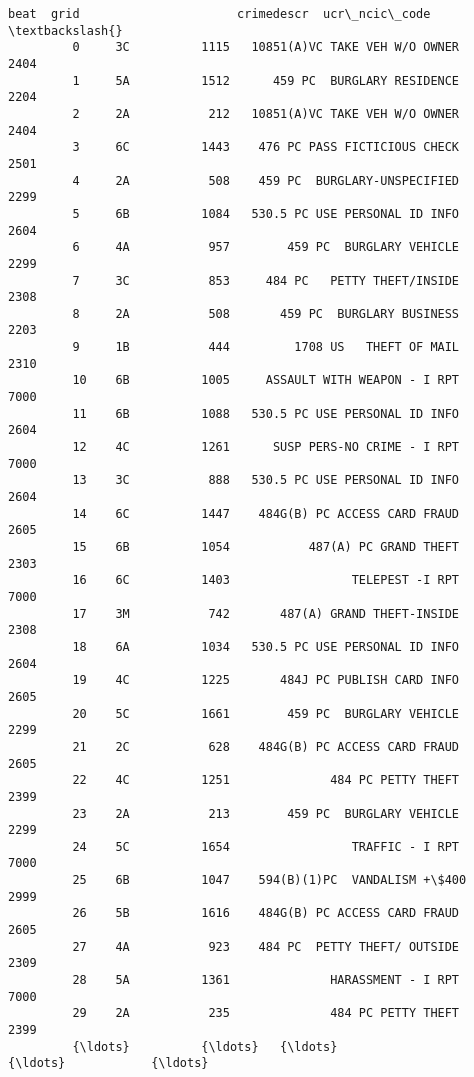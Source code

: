 \documentclass[11pt]{article}
\begin{document}
\begin{Verbatim}[commandchars=\\\{\}]
                     beat  grid                      crimedescr  ucr\_ncic\_code  \textbackslash{}
         0     3C          1115   10851(A)VC TAKE VEH W/O OWNER           2404   
         1     5A          1512      459 PC  BURGLARY RESIDENCE           2204   
         2     2A           212   10851(A)VC TAKE VEH W/O OWNER           2404   
         3     6C          1443    476 PC PASS FICTICIOUS CHECK           2501   
         4     2A           508    459 PC  BURGLARY-UNSPECIFIED           2299   
         5     6B          1084   530.5 PC USE PERSONAL ID INFO           2604   
         6     4A           957        459 PC  BURGLARY VEHICLE           2299   
         7     3C           853     484 PC   PETTY THEFT/INSIDE           2308   
         8     2A           508       459 PC  BURGLARY BUSINESS           2203   
         9     1B           444         1708 US   THEFT OF MAIL           2310   
         10    6B          1005     ASSAULT WITH WEAPON - I RPT           7000   
         11    6B          1088   530.5 PC USE PERSONAL ID INFO           2604   
         12    4C          1261      SUSP PERS-NO CRIME - I RPT           7000   
         13    3C           888   530.5 PC USE PERSONAL ID INFO           2604   
         14    6C          1447    484G(B) PC ACCESS CARD FRAUD           2605   
         15    6B          1054           487(A) PC GRAND THEFT           2303   
         16    6C          1403                 TELEPEST -I RPT           7000   
         17    3M           742       487(A) GRAND THEFT-INSIDE           2308   
         18    6A          1034   530.5 PC USE PERSONAL ID INFO           2604   
         19    4C          1225       484J PC PUBLISH CARD INFO           2605   
         20    5C          1661        459 PC  BURGLARY VEHICLE           2299   
         21    2C           628    484G(B) PC ACCESS CARD FRAUD           2605   
         22    4C          1251              484 PC PETTY THEFT           2399   
         23    2A           213        459 PC  BURGLARY VEHICLE           2299   
         24    5C          1654                 TRAFFIC - I RPT           7000   
         25    6B          1047    594(B)(1)PC  VANDALISM +\$400           2999   
         26    5B          1616    484G(B) PC ACCESS CARD FRAUD           2605   
         27    4A           923    484 PC  PETTY THEFT/ OUTSIDE           2309   
         28    5A          1361              HARASSMENT - I RPT           7000   
         29    2A           235              484 PC PETTY THEFT           2399   
         {\ldots}          {\ldots}   {\ldots}                             {\ldots}            {\ldots}   

\end{Verbatim}
\end{document}
